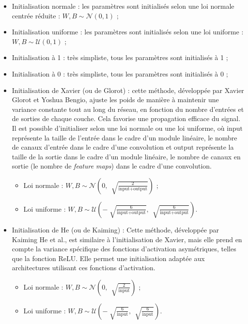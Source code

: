 \documentclass{article}
\begin{document}
\begin{itemize}
    \item Initialisation normale : les paramètres sont initialisés selon une loi normale centrée réduite : $ W, B \sim \mathcal{N}(0, 1) $ ;
    \item Initialisation uniforme : les paramètres sont initialisés selon une loi uniforme : $ W, B \sim \mathcal{U}(0, 1) $ ;
    \item Initialisation à 1 : très simpliste, tous les paramètres sont initialisés à 1 ;
    \item Initialisation à 0 : très simpliste, tous les paramètres sont initialisés à 0 ;
    \item Initialisation de Xavier (ou de Glorot) : cette méthode, développée par Xavier Glorot et Yoshua Bengio, ajuste les poids de manière à maintenir une variance constante tout au long du réseau, en fonction du nombre d'entrées et de sorties de chaque couche. Cela favorise une propagation efficace du signal. Il est possible d'initialiser selon une loi normale ou une loi uniforme, où $ \text{input} $ représente la taille de l'entrée dans le cadre d'un module linéaire, le nombre de canaux d'entrée dans le cadre d'une convolution et $ \text{output} $ représente la taille de la sortie dans le cadre d'un module linéaire, le nombre de canaux en sortie (le nombre de \textit{feature maps}) dans le cadre d'une convolution.
    \begin{itemize}
        \item Loi normale : $ W, B \sim \mathcal{N}(0, \, \sqrt[]{\frac{2}{\text{input} + \text{output}}}) $ ;
        \item Loi uniforme : $ W, B \sim \mathcal{U}(- \sqrt[]{\frac{6}{\text{input} + \text{output}}}, \, \sqrt[]{\frac{6}{\text{input} + \text{output}}}) $.
    \end{itemize}
    \item Initialisation de He (ou de Kaiming) : Cette méthode, développée par Kaiming He et al., est similaire à l'initialisation de Xavier, mais elle prend en compte la variance spécifique des fonctions d'activation asymétriques, telles que la fonction ReLU. Elle permet une initialisation adaptée aux architectures utilisant ces fonctions d'activation. 
    \begin{itemize}
        \item Loi normale : $ W, B \sim \mathcal{N}(0, \, \sqrt[]{\frac{2}{\text{input}}}) $ ;
        \item Loi uniforme : $ W, B \sim \mathcal{U}(- \sqrt[]{\frac{6}{\text{input}}}, \, \sqrt[]{\frac{6}{\text{input}}}) $.
    \end{itemize}
\end{itemize}
\end{document}
